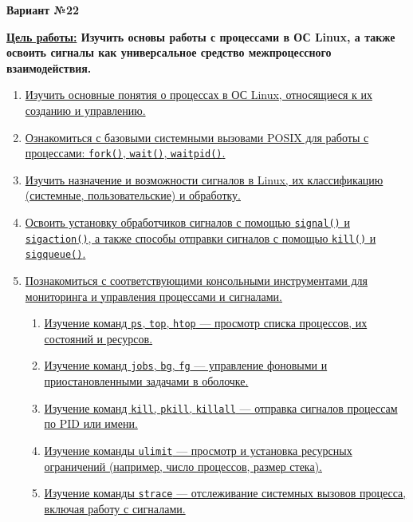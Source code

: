  \begin{center}
        {\large \textbf{Вариант №22 \\
        }}
    \end{center}

    \textbf{\underline{Цель работы:} Изучить основы работы с процессами в ОС Linux, а также освоить сигналы как универсальное средство межпроцессного взаимодействия.
    } 

    \begin{enumerate}
        \item \hyperref[sec:1]{Изучить основные понятия о процессах в ОС Linux, относящиеся к их созданию и управлению.}
        
        \item \hyperref[sec:2]{Ознакомиться с базовыми системными вызовами POSIX для работы с процессами: \texttt{fork()}, \texttt{wait()}, \texttt{waitpid()}.}
        
        \item \hyperref[sec:3]{Изучить назначение и возможности сигналов в Linux, их классификацию (системные, пользовательские) и обработку.}
        
        \item \hyperref[sec:4]{Освоить установку обработчиков сигналов с помощью \texttt{signal()} и \texttt{sigaction()}, а также способы отправки сигналов с помощью \texttt{kill()} и \texttt{sigqueue()}.}
        
        \item \hyperref[sec:5]{Познакомиться с соответствующими консольными инструментами для мониторинга и управления процессами и сигналами.}
        \begin{enumerate}[label=\arabic{enumi}.\arabic*]
            \item \hyperref[sec:5.1]{Изучение команд \texttt{ps}, \texttt{top}, \texttt{htop} — просмотр списка процессов, их состояний и ресурсов.}
            \item \hyperref[sec:5.2]{Изучение команд \texttt{jobs}, \texttt{bg}, \texttt{fg} — управление фоновыми и приостановленными задачами в оболочке.}
            \item \hyperref[sec:5.3]{Изучение команд \texttt{kill}, \texttt{pkill}, \texttt{killall} — отправка сигналов процессам по PID или имени.}
            \item \hyperref[sec:5.4]{Изучение команды \texttt{ulimit} — просмотр и установка ресурсных ограничений (например, число процессов, размер стека).}
            \item \hyperref[sec:5.5]{Изучение команды \texttt{strace} — отслеживание системных вызовов процесса, включая работу с сигналами.}
        \end{enumerate}
        

\end{enumerate}
